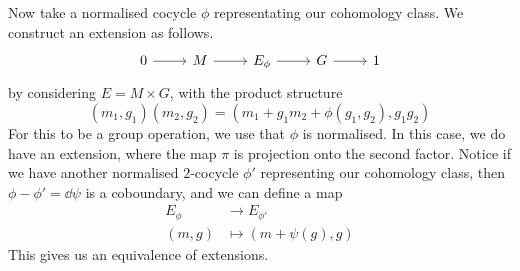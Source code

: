 \documentclass{article}
\begin{document}
Now take a normalised cocycle \(\phi\) representating our cohomology class. We construct an extension as follows.
\[\begin{tikzcd}
	0 & M & {E_\phi} & G & 1
	\arrow[from=1-1, to=1-2]
	\arrow[from=1-2, to=1-3]
	\arrow[from=1-3, to=1-4]
	\arrow[from=1-4, to=1-5]
\end{tikzcd}\]
by considering \(E = M \times G\), with the product structure
\[(m_1, g_1)(m_2, g_2) = (m_1 + g_1m_2 + \phi(g_1, g_2), g_1g_2)\]
For this to be a group operation, we use that \(\phi\) is normalised. In this case, we do have an extension, where the map \(\pi\) is projection onto the second factor. Notice if we have another normalised \(2\)-cocycle \(\phi'\) representing our cohomology class, then \(\phi - \phi' = \dd\psi\) is a coboundary, and we can define a map
\begin{align*}
    E_\phi &\to E_{\phi'} \\
    (m, g) &\mapsto (m + \psi(g), g)
\end{align*}
This gives us an equivalence of extensions.
\end{document}
